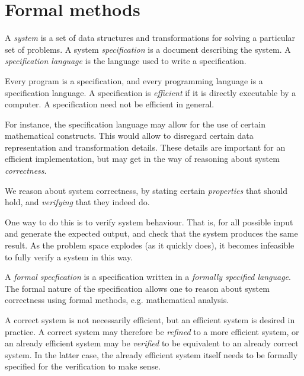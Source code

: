 \section*{Formal methods}


A \emph{system} is a set of data structures and transformations for solving a
particular set of problems. A system \emph{specification} is a document
describing the system. A \emph{specification language} is the language used to
write a specification.

Every program is a specification, and every programming language is a
specification language. A specification is \emph{efficient} if it is directly
executable by a computer. A specification need not be efficient in general.

For instance, the specification language may allow for the use of certain
mathematical constructs. This would allow to disregard certain data
representation and transformation details. These details are important for an
efficient implementation, but may get in the way of reasoning about system
\emph{correctness}.

We reason about system correctness, by stating certain \emph{properties} that
should hold, and \emph{verifying} that they indeed do.

One way to do this is to verify system behaviour. That is, for all possible
input and generate the expected output, and check that the system produces the
same result. As the problem space explodes (as it quickly does), it becomes
infeasible to fully verify a system in this way.

A \emph{formal specfication} is a specification written in a \emph{formally
specified language}. The formal nature of the specification allows one to
reason about system correctness using formal methods, e.g. mathematical
analysis.

A correct system is not necessarily efficient, but an efficient system is
desired in practice. A correct system may therefore be \emph{refined} to a more
efficient system, or an already efficient system may be \emph{verified} to be
equivalent to an already correct system. In the latter case, the already
efficient system itself needs to be formally specified for the verification to
make sense.

